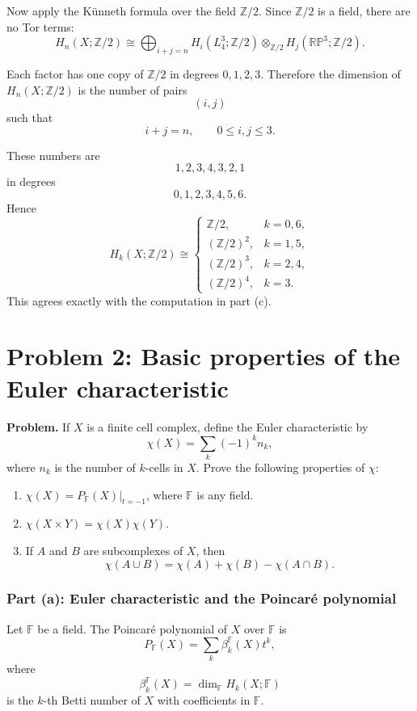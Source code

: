 \documentclass[12pt,a4paper]{article}
\theoremstyle{notespace}
\begin{document}
Now apply the Künneth formula over the field \(\mathbb Z/2\). Since \(\mathbb Z/2\) is a field, there are no Tor terms:
\[
H_n(X;\mathbb Z/2)
\cong
\bigoplus_{i+j=n}
H_i(L_4^3;\mathbb Z/2)
\otimes_{\mathbb Z/2}
H_j(\mathbb{RP}^3;\mathbb Z/2).
\]

Each factor has one copy of \(\mathbb Z/2\) in degrees \(0,1,2,3\). Therefore the dimension of \(H_n(X;\mathbb Z/2)\) is the number of pairs
\[
(i,j)
\]
such that
\[
i+j=n,
\qquad
0\leq i,j\leq 3.
\]

These numbers are
\[
1,2,3,4,3,2,1
\]
in degrees
\[
0,1,2,3,4,5,6.
\]
Hence
\[
\boxed{
	H_k(X;\mathbb Z/2)\cong
	\begin{cases}
		\mathbb Z/2, & k=0,6,\\[1mm]
		(\mathbb Z/2)^2, & k=1,5,\\[1mm]
		(\mathbb Z/2)^3, & k=2,4,\\[1mm]
		(\mathbb Z/2)^4, & k=3.
\end{cases}}
\]
This agrees exactly with the computation in part (c).

\section{Problem 2: Basic properties of the Euler characteristic}

\textbf{Problem.}
If \(X\) is a finite cell complex, define the Euler characteristic by
\[
\chi(X)=\sum_k (-1)^k n_k,
\]
where \(n_k\) is the number of \(k\)-cells in \(X\). Prove the following properties of \(\chi\):
\begin{enumerate}
	\item[(a)] \(\chi(X)=P_{\mathbb F}(X)\big|_{t=-1}\), where \(\mathbb F\) is any field.
	\item[(b)] \(\chi(X\times Y)=\chi(X)\chi(Y)\).
	\item[(c)] If \(A\) and \(B\) are subcomplexes of \(X\), then
	\[
	\chi(A\cup B)=\chi(A)+\chi(B)-\chi(A\cap B).
	\]
\end{enumerate}

\subsubsection{Part (a): Euler characteristic and the Poincaré polynomial}

Let \(\mathbb F\) be a field. The Poincaré polynomial of \(X\) over \(\mathbb F\) is
\[
P_{\mathbb F}(X)
=
\sum_k \beta_k^{\mathbb F}(X)t^k,
\]
where
\[
\beta_k^{\mathbb F}(X)
=
\dim_{\mathbb F} H_k(X;\mathbb F)
\]
is the \(k\)-th Betti number of \(X\) with coefficients in \(\mathbb F\).
\end{document}
